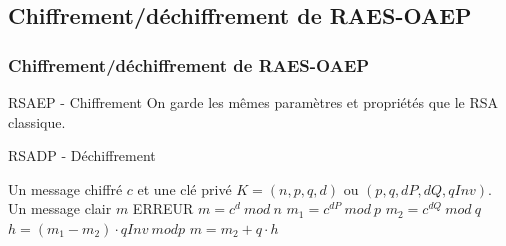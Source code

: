 \documentclass[10pt]{beamer}
\theoremstyle{plain}
\theoremstyle{definition}
\theoremstyle{remark}
\begin{document}
\subsection{Chiffrement/déchiffrement de RAES-OAEP}
\begin{frame}
\frametitle{Chiffrement/déchiffrement de RAES-OAEP}
\transwipe
\begin{block}{RSAEP - Chiffrement}
On garde les mêmes paramètres et propriétés que le RSA classique.
\end{block}
\begin{algorithm}[H]
\caption{RSADP - Déchiffrement}
\label{rsadp}
\begin{algorithmic} 
\REQUIRE Un message chiffré $c$ et une clé privé $K = (n, p, q, d)$ ou $(p, q, dP, dQ, qInv)$. 
\ENSURE Un message clair $m$
    \RETURN ERREUR
\ENDIF
{}
	\RETURN $m = c^{d}\ mod\ n$
\ENDIF
\STATE $m_{1} = c^{dP}\ mod\ p$
\STATE $m_{2} = c^{dQ}\ mod\ q$
\STATE $h = (m_{1} - m_{2})\cdot qInv\ mod p$
\RETURN $m = m_{2} + q\cdot h$

\end{algorithmic}
\end{algorithm}
\end{frame}
\end{document}
